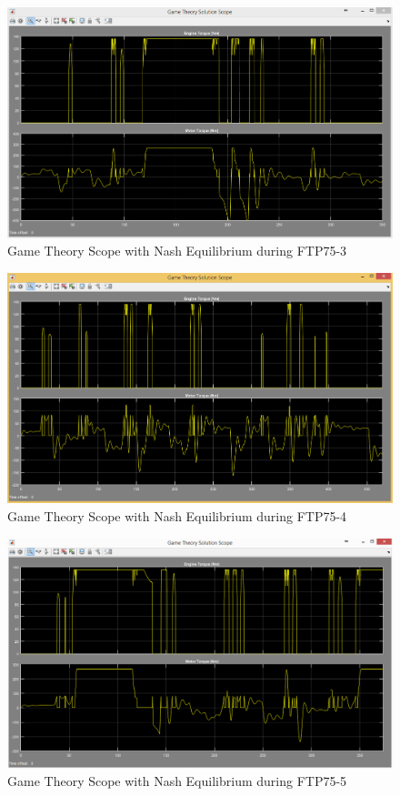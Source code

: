 \begin{figure}[h]
\centering
\includegraphics[scale=0.45]{figures/NashEquilibrium/FTP75-3/gameTheory15Juni}
\caption{Game Theory Scope with Nash Equilibrium during FTP75-3}
\label{fig:gtne3}
\end{figure}


\begin{figure}[h]
\centering
\includegraphics[scale=0.45]{figures/NashEquilibrium/FTP75-4/gameTheory15Juni}
\caption{Game Theory Scope with Nash Equilibrium during FTP75-4}
\label{fig:gtne4}
\end{figure}


\begin{figure}[h]
\centering
\includegraphics[scale=0.45]{figures/NashEquilibrium/FTP75-5/gameTheory16Juni}
\caption{Game Theory Scope with Nash Equilibrium during FTP75-5}
\label{fig:gtne5}
\end{figure}


